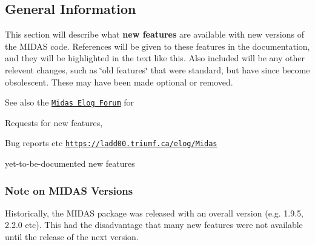 \par
  \par
\hypertarget{NDF_ndf_info}{}\subsection{General Information}\label{NDF_ndf_info}
This section will describe what {\bfseries new features} are available with new versions of the MIDAS code. References will be given to these features in the documentation, and they will be highlighted in the text like this. Also included will be any other relevent changes, such as \char`\"{}old features\char`\"{} that were standard, but have since become obsolescent. These may have been made optional or removed.

See also the \href{https://ladd00.triumf.ca/elog/Midas}{\tt Midas Elog Forum} for
\begin{DoxyItemize}
\item Requests for new features,
\item Bug reports etc \href{https://ladd00.triumf.ca/elog/Midas}{\tt https://ladd00.triumf.ca/elog/Midas}
\item yet-\/to-\/be-\/documented new features
\end{DoxyItemize}\hypertarget{NDF_NDF_versions}{}\subsubsection{Note on MIDAS Versions}\label{NDF_NDF_versions}
Historically, the MIDAS package was released with an overall version (e.g. 1.9.5, 2.2.0 etc). This had the disadvantage that many new features were not available until the release of the next version.

